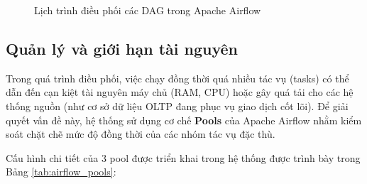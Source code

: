 \begin{figure}[H]
    \caption{Lịch trình điều phối các DAG trong Apache Airflow}
    \label{fig:airflow_dag_timeline}
\end{figure}
\subsection{Quản lý và giới hạn tài nguyên}

Trong quá trình điều phối, việc chạy đồng thời quá nhiều tác vụ (tasks) có thể dẫn đến cạn kiệt tài nguyên máy chủ (RAM, CPU) hoặc gây quá tải cho các hệ thống nguồn (như cơ sở dữ liệu OLTP đang phục vụ giao dịch cốt lõi). Để giải quyết vấn đề này, hệ thống sử dụng cơ chế \textbf{Pools} của Apache Airflow nhằm kiểm soát chặt chẽ mức độ đồng thời của các nhóm tác vụ đặc thù. 

Cấu hình chi tiết của 3 pool được triển khai trong hệ thống được trình bày trong Bảng \ref{tab:airflow_pools}:


